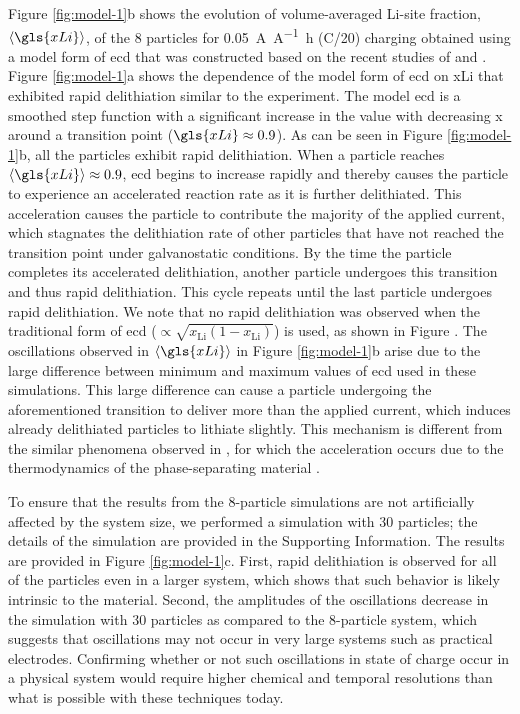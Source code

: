 \documentclass{article}
\begin{document}
Figure \ref{fig:model-1}b shows the evolution of volume-averaged
Li-site fraction, $\left\langle \gls{xLi} \right\rangle$, of the 8
particles for \SI{0.05}{\ampere\per\ampere\hour} (C/20) charging
obtained using a model form of \gls{ecd} that was constructed based on
the recent studies of \nca{} \cite{chueh2021} and \nmc{}
\cite{mukherjee2017, chiang2020, tsai2018}. Figure \ref{fig:model-1}a
shows the dependence of the model form of \gls{ecd} on \gls{xLi} that
exhibited rapid delithiation similar to the experiment. The model
\gls{ecd} is a smoothed step function with a significant increase in
the value with decreasing x around a transition point
($\gls{xLi}\approx0.9$). As can be seen in Figure \ref{fig:model-1}b,
all the particles exhibit rapid delithiation. When a particle reaches
$\left\langle \gls{xLi} \right\rangle\approx0.9$, \gls{ecd} begins to
increase rapidly and thereby causes the particle to experience an
accelerated reaction rate as it is further delithiated. This
acceleration causes the particle to contribute the majority of the
applied current, which stagnates the delithiation rate of other
particles that have not reached the transition point under
galvanostatic conditions. By the time the particle completes its
accelerated delithiation, another particle undergoes this transition
and thus rapid delithiation. This cycle repeats until the last
particle undergoes rapid delithiation.  We note that no rapid
delithiation was observed when the traditional form of \gls{ecd}
($\propto\sqrt{{x_{\textrm{Li}}}(1-{x_{\textrm{Li}}})}$) is
used\cite{newman1993, newman1996, newman1994, newman1995}, as shown in
Figure . The oscillations observed in
$\left\langle \gls{xLi} \right\rangle$ in Figure \ref{fig:model-1}b
arise due to the large difference between minimum and maximum values
of \gls{ecd} used in these simulations. This large difference can
cause a particle undergoing the aforementioned transition to deliver
more than the applied current, which induces already delithiated
particles to lithiate slightly. This mechanism is different from the
similar phenomena observed in , for which the
acceleration occurs due to the thermodynamics of the phase-separating
material \cite{thornton2015}.

To ensure that the results from the 8-particle simulations are not
artificially affected by the system size, we performed a simulation
with 30 particles; the details of the simulation are provided in the
Supporting Information. The results are provided in Figure
\ref{fig:model-1}c. First, rapid delithiation is observed for all of
the particles even in a larger system, which shows that such behavior
is likely intrinsic to the material. Second, the amplitudes of the
oscillations decrease in the simulation with 30 particles as compared
to the 8-particle system, which suggests that oscillations may not
occur in very large systems such as practical electrodes.  Confirming
whether or not such oscillations in state of charge occur in a
physical system would require higher chemical and temporal resolutions
than what is possible with these techniques today.
\end{document}

